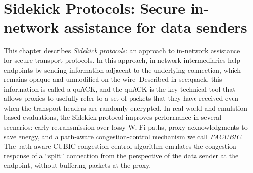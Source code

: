 \chapter[Sidekick Protocols]{Sidekick Protocols: Secure in-network assistance for data senders}
\label{sec:sidekick}

This chapter describes \emph{Sidekick protocols}: an approach to in-network
assistance for secure transport protocols. In this approach, in-network
intermediaries help endpoints by sending information adjacent to the underlying
connection, which remains opaque and unmodified on the wire. Described in \Cref
{sec:quack}, this information is called a quACK, and the quACK is the key
technical tool that allows proxies to usefully refer to a set of packets that
they have received even when the transport headers are randomly encrypted. In
real-world and emulation-based evaluations, the Sidekick protocol improves
performance in several scenarios: early retransmission over lossy Wi-Fi paths,
proxy acknowledgments to save energy, and a path-aware congestion-control
mechanism we call \emph{PACUBIC}. The path-aware CUBIC congestion control
algorithm emulates the congestion response of a ``split'' connection from the
perspective of the data sender at the endpoint, without buffering packets at
the proxy.







